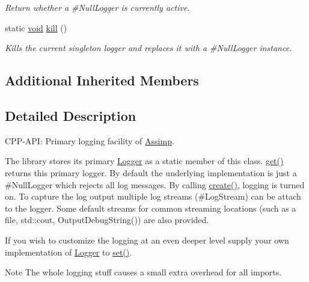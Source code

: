 \begin{DoxyCompactItemize}
\begin{DoxyCompactList}\small\item\em Return whether a \#\-Null\-Logger is currently active. \end{DoxyCompactList}\item 
static \hyperlink{_s_d_l__opengl_8h_a3db05964a3cc4410f35b7ea2b7eb850d}{void} \hyperlink{class_assimp_1_1_default_logger_a0b1da096d7442af5a4a4cb5ebb2540f7}{kill} ()
\begin{DoxyCompactList}\small\item\em Kills the current singleton logger and replaces it with a \#\-Null\-Logger instance. \end{DoxyCompactList}\end{DoxyCompactItemize}
\subsection*{Additional Inherited Members}


\subsection{Detailed Description}
C\-P\-P-\/\-A\-P\-I\-: Primary logging facility of \hyperlink{namespace_assimp}{Assimp}. 

The library stores its primary \hyperlink{class_assimp_1_1_logger_a784e6d1a741072b17bab32a6a41055e8}{Logger} as a static member of this class. \hyperlink{class_assimp_1_1_default_logger_a7d0a53f2db66945ade30094330a77ba4}{get()} returns this primary logger. By default the underlying implementation is just a \#\-Null\-Logger which rejects all log messages. By calling \hyperlink{class_assimp_1_1_default_logger_adccb11f85f8b0ef226c382e11ba665c3}{create()}, logging is turned on. To capture the log output multiple log streams (\#\-Log\-Stream) can be attach to the logger. Some default streams for common streaming locations (such as a file, std\-::cout, Output\-Debug\-String()) are also provided.

If you wish to customize the logging at an even deeper level supply your own implementation of \hyperlink{class_assimp_1_1_logger_a784e6d1a741072b17bab32a6a41055e8}{Logger} to \hyperlink{class_assimp_1_1_default_logger_a9daba548026045b99813c760c2842ed2}{set()}. \begin{DoxyNote}{Note}
The whole logging stuff causes a small extra overhead for all imports. 
\end{DoxyNote}


